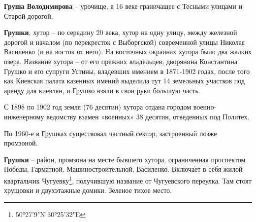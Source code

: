 \medskip

\textbf{Груша Володимирова} – урочище, в 16 веке граничащее с Тесными улицами и Старой дорогой.\\

\medskip

\textbf{Грушки}, хутор – по середину 20 века, хутор на одну улицу, между железной дорогой и началом (по перекресток с Выборгской) современной улицы Николая Василенко (и на восток от него). На восточных окраинах хутора было два жалких озера. Название хутора – от его прежних владельцев, дворянина Константина Грушко и его супруги Устины, владевших имением в 1871-1902 годах, после того как Киевская палата казенных имений выделила тут 14 земельных участков под аренду для киевлян, и Грушко взяли в свои руки большую часть. 

С 1898 по 1902 год земля (76 десятин) хутора отдана городом военно-инженерному ведомству взамен «военных» 38 десятин, отведенных под Политех.

По 1960-е в Грушках существовал частный сектор, застроенный позже промзоной.\\

\medskip

\textbf{Грушки} – район, промзона на месте бывшего хутора, ограниченная проспектом Победы, Гарматной, Машиностроительной, Василенко. Включает в себя жилой квартальчик Чугуевку\footnote{50°27'9"N   30°25'32"E}, получившую название от Чугуевского переулка. Там стоят хрущовки и двухэтажные домики. Зеленое тихое место.
